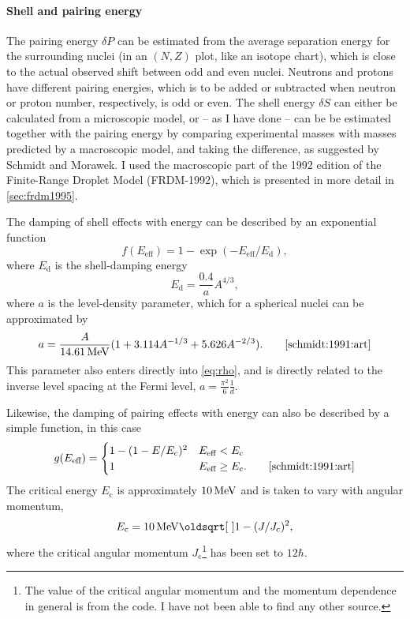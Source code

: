 \paragraph{Shell and pairing energy}
The pairing energy $\delta P$ can be estimated from the average separation energy for the surrounding nuclei (in an $(N,Z)$ plot, like an isotope chart), which is close to the actual observed shift between odd and even nuclei\cite{ericson:1960}. Neutrons and protons have different pairing energies, which is to be added or subtracted when neutron or proton number, respectively, is odd or even. 
The shell energy $\delta S$ can either be calculated from a microscopic model, or -- as I have done -- can be be estimated together with the pairing energy by comparing experimental masses with masses predicted by a macroscopic model, and taking the difference, as suggested by Schmidt and Morawek\cite{schmidt:1991:art}. I used the macroscopic part of the 1992 edition of the Finite-Range Droplet Model (FRDM-1992)\cite{moller1995}, which is presented in more detail in \autoref{sec:frdm1995}.

The damping of shell effects with energy can be described by an exponential function
\begin{equation}
f(E_\text{eff}) = 1-\exp{\left(-E_\text{eff}/E_\text{d}\right)},
\end{equation}
where $E_\text{d}$ is the shell-damping energy 
\begin{equation}
E_\text{d} = \frac{0.4}{a} A^{4/3},
\end{equation}
where $a$ is the level-density parameter, which for a spherical nuclei can be approximated by
\begin{equation}
a=\frac{A}{\unit[14.61]{MeV}}(1+3.114 A^{-1/3} + 5.626 A^{-2/3}).\qquad\cite{schmidt:1991:art}\label{eq:a}
\end{equation}
This parameter also enters directly into \eqref{eq:rho}, and is directly related to the inverse level spacing at the Fermi level, $a=\tfrac{\pi^2}{6} \tfrac{1}{d}$.

Likewise, the damping of pairing effects with energy can also be described by a simple function, in this case
\begin{equation}
g(E_\text{eff}) = \begin{cases} 1-(1-E/E_\text{c})^2 & E_\text{eff} < E_\text{c} \\
 1 & E_\text{eff} \ge E_\text{c}.\qquad\cite{schmidt:1991:art}
\end{cases}
\end{equation}
The critical energy $E_\text{c}$ is approximately $\unit[10]{MeV}$ and is taken to vary with angular momentum, 
\begin{equation}
E_\text{c} = \unit[10]{MeV}\sqrt{1-(J/J_\text{c})^2},
\end{equation}
where the critical angular momentum $J_\text{c}$\footnote{The value of the critical angular momentum and the momentum dependence in general is from the  code. I have not been able to find any other source.}  has been set to $12\hbar$.
